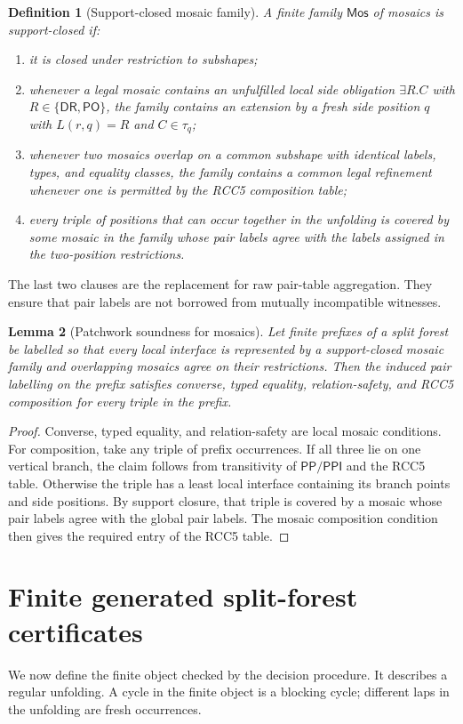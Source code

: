 \documentclass[11pt]{article}
\newtheorem{definition}{Definition}[section]
\newtheorem{lemma}[definition]{Lemma}
\theoremstyle{remark}
\newcommand{\DR}{\mathsf{DR}}
\newcommand{\PO}{\mathsf{PO}}
\newcommand{\PP}{\mathsf{PP}}
\newcommand{\PPI}{\mathsf{PPI}}
\newcommand{\Mos}{\mathsf{Mos}}
\begin{document}
\begin{definition}[Support-closed mosaic family]
A finite family $\Mos$ of mosaics is support-closed if:
\begin{enumerate}[label=(SC\arabic*)]
\item it is closed under restriction to subshapes;
\item whenever a legal mosaic contains an unfulfilled local side obligation $\exists R.C$ with $R\in\{\DR,\PO\}$, the family contains an extension by a fresh side position $q$ with $L(r,q)=R$ and $C\in\tau_q$;
\item whenever two mosaics overlap on a common subshape with identical labels, types, and equality classes, the family contains a common legal refinement whenever one is permitted by the RCC5 composition table;
\item every triple of positions that can occur together in the unfolding is covered by some mosaic in the family whose pair labels agree with the labels assigned in the two-position restrictions.
\end{enumerate}
\end{definition}

The last two clauses are the replacement for raw pair-table aggregation.  They ensure that pair labels are not borrowed from mutually incompatible witnesses.

\begin{lemma}[Patchwork soundness for mosaics]\label{lem:mosaic-patchwork}
Let finite prefixes of a split forest be labelled so that every local interface is represented by a support-closed mosaic family and overlapping mosaics agree on their restrictions.  Then the induced pair labelling on the prefix satisfies converse, typed equality, relation-safety, and RCC5 composition for every triple in the prefix.
\end{lemma}
\begin{proof}
Converse, typed equality, and relation-safety are local mosaic conditions.  For composition, take any triple of prefix occurrences.  If all three lie on one vertical branch, the claim follows from transitivity of $\PP/\PPI$ and the RCC5 table.  Otherwise the triple has a least local interface containing its branch points and side positions.  By support closure, that triple is covered by a mosaic whose pair labels agree with the global pair labels.  The mosaic composition condition then gives the required entry of the RCC5 table.
\end{proof}

\section{Finite generated split-forest certificates}
We now define the finite object checked by the decision procedure.  It describes a regular unfolding.  A cycle in the finite object is a blocking cycle; different laps in the unfolding are fresh occurrences.
\end{document}
